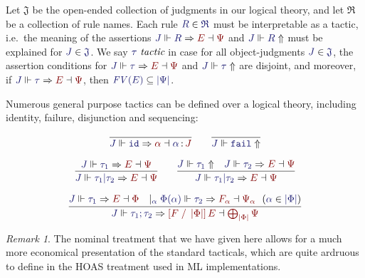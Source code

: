 \documentclass[11pt]{article}
\theoremstyle{definition}
\theoremstyle{remark}
\newtheorem{remark}[thm]{Remark}
\numberwithin{equation}{section}
\def\InputModeColorName{MidnightBlue}
\def\OutputModeColorName{Maroon}
\newcommand\InputMode[1]{{\color{\InputModeColorName}{#1}}}
\newcommand\OutputMode[1]{{\color{\OutputModeColorName}{#1}}}
\newcommand\HypJ[2]{#1\ \ (#2)}
\newcommand\GenJ[2]{\vert_{\InputMode{#1}}\; #2}
\newcommand\JJ{J}
\newcommand\RSet{\mathfrak{R}}
\newcommand\JSet{\mathfrak{J}}
\newcommand\IsTac[1]{\InputMode{#1}\ \textit{tactic}}
\newcommand\OSG[2]{\InputMode{#1}\,{\color{Black}:}\,\OutputMode{#2}}
\newcommand\Refine[4]{\InputMode{#1}\Vdash\InputMode{#2}\Rightarrow\OutputMode{#4}\dashv\OutputMode{#3}}
\newcommand\NoRefine[2]{\InputMode{#1}\Vdash\InputMode{#2}\Uparrow}
\newcommand\Member[2]{\InputMode{#1}\in\InputMode{#2}}
\newcommand\IdTac{\mathtt{id}}
\newcommand\FailTac{\mathtt{fail}}
\newcommand\OrElseTac[2]{#1\vert#2}
\newcommand\ThenTac[2]{#1;#2}
\newcommand\Dom[1]{\left\vert#1\right\vert}
\newcommand\SubsetEq[2]{\InputMode{#1}\subseteq\InputMode{#2}}
\newcommand\FV[1]{\textit{FV}\left(#1\right)}
\newcommand\Subst[3]{\left[#1\;/\;#2\right]#3}
\begin{document}
Let $\JSet$ be the open-ended collection of judgments in our logical theory,
and let $\RSet$ be a collection of rule names. Each rule $\Member{R}{\RSet}$
must be interpretable as a tactic, i.e.\ the meaning of the assertions
$\Refine{\JJ}{R}{\Psi}{E}$ and $\NoRefine{\JJ}{R}$ must be explained for
$\Member{J}{\JSet}$. We say $\IsTac{\tau}$ in case for all object-judgments
$\Member{\JJ}{\JSet}$, the assertion conditions for
$\Refine{\JJ}{\tau}{\Psi}{E}$ and $\NoRefine{\JJ}{\tau}$ are disjoint, and
moreover, if $\Refine{\JJ}{\tau}{\Psi}{E}$, then
$\SubsetEq{\FV{E}}{\Dom{\Psi}}$.

Numerous general purpose tactics can be defined over a logical theory,
including identity, failure, disjunction and sequencing:

\begin{gather*}
  \infer{
    \Refine{\JJ}{\IdTac}{\OSG{\alpha}{\JJ}}{\alpha}
  }{
  }
  \qquad
  \infer{
    \NoRefine{\JJ}{\FailTac}
  }{
  }\\[6pt]
  \infer{
    \Refine{\JJ}{\OrElseTac{\tau_1}{\tau_2}}{\Psi}{E}
  }{
    \Refine{\JJ}{\tau_1}{\Psi}{E}
  }
  \qquad
  \infer{
    \Refine{\JJ}{\OrElseTac{\tau_1}{\tau_2}}{\Psi}{E}
  }{
    \NoRefine{\JJ}{\tau_1} &
    \Refine{\JJ}{\tau_2}{\Psi}{E}
  }\\[6pt]
  \infer{
    \Refine{\JJ}{\ThenTac{\tau_1}{\tau_2}}{\bigoplus_{\Dom\Phi}\Psi}{\Subst{F}{\Dom\Phi}{E}}
  }{
    \Refine{\JJ}{\tau_1}{\Phi}{E} &
    \GenJ{\alpha}{
      \HypJ{
        \Refine{\Phi(\alpha)}{\tau_2}{\Psi_\alpha}{F_\alpha}
      }{
        \Member{\alpha}{\Dom\Phi}
      }
    }
  }
\end{gather*}

\begin{remark}
  The nominal treatment that we have given here allows for a much more
  economical presentation of the standard tacticals, which are quite ardruous
  to define in the HOAS treatment used in ML implementations.
\end{remark}
\end{document}
